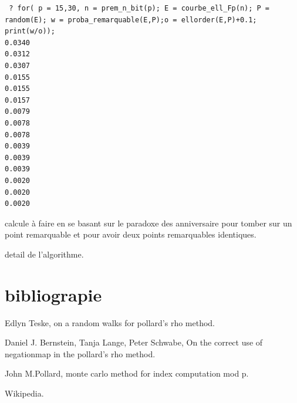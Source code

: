 \documentclass[a4paper,10pt]{report}
\begin{document}
\begin{verbatim}
 ? for( p = 15,30, n = prem_n_bit(p); E = courbe_ell_Fp(n); P = random(E); w = proba_remarquable(E,P);o = ellorder(E,P)+0.1; print(w/o));
0.0340
0.0312
0.0307
0.0155
0.0155
0.0157
0.0079
0.0078
0.0078
0.0039
0.0039
0.0039
0.0020
0.0020
0.0020

\end{verbatim}



calcule à faire en se basant sur le paradoxe des anniversaire pour tomber sur un point remarquable et pour avoir deux points remarquables identiques.

detail de l'algorithme.

\chapter{bibliograpie}
Edlyn Teske, on a random walks for pollard's rho method.

Daniel J. Bernstein, Tanja Lange, Peter Schwabe, On the correct use of negationmap in the pollard's rho method.

John M.Pollard, monte carlo method for index computation mod p.

Wikipedia.
\end{document}

